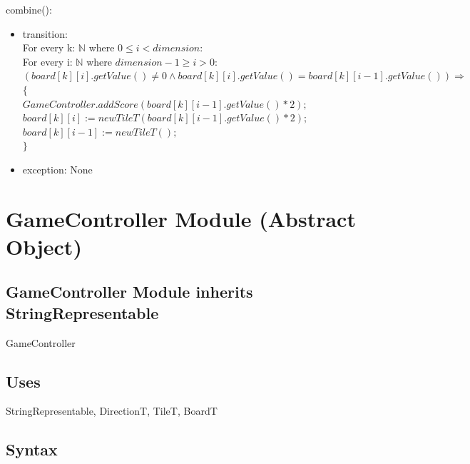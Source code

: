 \documentclass[12pt]{article}
\begin{document}
\noindent combine():
\begin{itemize}
  \item transition:\\
        \noindent For every k: $\mathbb{N}$ where $0 \le i < dimension$: \\
        \noindent\hspace*{0.5cm} For every i: $\mathbb{N}$ where $dimension - 1 \ge i > 0$: \\
        \noindent\hspace*{1.45cm} $(board[k][i].getValue() \ne 0 \wedge board[k][i].getValue() = board[k][i - 1].getValue()) \Rightarrow$\\
        \noindent\hspace*{1.45cm} $\{$\\
        \noindent\hspace*{1.95cm} $GameController.addScore(board[k][i - 1].getValue() * 2);$\\
        \noindent\hspace*{1.95cm} $board[k][i] := new TileT(board[k][i - 1].getValue() * 2);$\\
        \noindent\hspace*{1.95cm} $board[k][i - 1] := new TileT();$\\
        \noindent\hspace*{1.45cm} $\}$
  \item exception: None
\end{itemize}

\newpage

\section* {GameController Module (Abstract Object)}

\subsection*{GameController Module inherits StringRepresentable}

GameController

\subsection* {Uses}

StringRepresentable, DirectionT, TileT, BoardT

\subsection* {Syntax}
\end{document}
